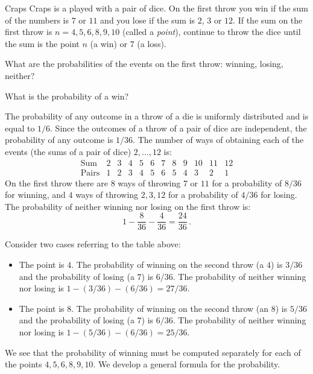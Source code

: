 
\begin{prob}{Craps}
Craps is a played with a pair of dice. On the first throw you win if the sum of the numbers is $7$ or $11$ and you lose if the sum is $2$, $3$ or $12$. If the sum on the first throw is $n=4,5,6,8,9,10$ (called a \emph{point}), continue to throw the dice until the sum is the point $n$ (a win) or $7$ (a loss).

 What are the probabilities of the events on the first throw: winning, losing, neither?

 What is the probability of a win?
\end{prob}


 The probability of any outcome in a throw of a die is uniformly distributed and is equal to $1/6$. Since the outcomes of a throw of a pair of dice are independent, the probability of any outcome is $1/36$. The number of ways of obtaining each of the events (the sums of a pair of dice) $2,\ldots,12$ is:
\[
\begin{array}{l|rrrrrrrrrrr}
\textrm{Sum} & 2 & 3 & 4 & 5 & 6 & 7 & 8 & 9 & 10 & 11 & 12\\\hline
\textrm{Pairs} & 1 & 2 & 3 & 4 & 5 & 6 & 5 & 4 & 3 & 2 & 1
\end{array}
\]
On the first throw there are $8$ ways of throwing $7$ or $11$ for a probability of $8/36$ for winning, and $4$ ways of throwing $2,3,12$ for a probability of $4/36$ for losing. The probability of neither winning nor losing on the first throw is:
\[
1 - \frac{8}{36} - \frac{4}{36} = \frac{24}{36}\,.
\]

Consider two cases referring to the table above:
\begin{itemize}
\item The point is $4$. The probability of winning on the second throw (a $4$) is $3/36$ and the probability of losing (a $7$) is $6/36$. The probability of neither winning nor losing is $1-(3/36)-(6/36)=27/36$.
\item The point is $8$. The probability of winning on the second throw (an $8$) is $5/36$ and the probability of losing (a $7$) is $6/36$. The probability of neither winning nor losing is $1-(5/36)-(6/36)=25/36$.
\end{itemize}
We see that the probability of winning must be computed separately for each of the points $4,5,6,8,9,10$. We develop a general formula for the probability.

